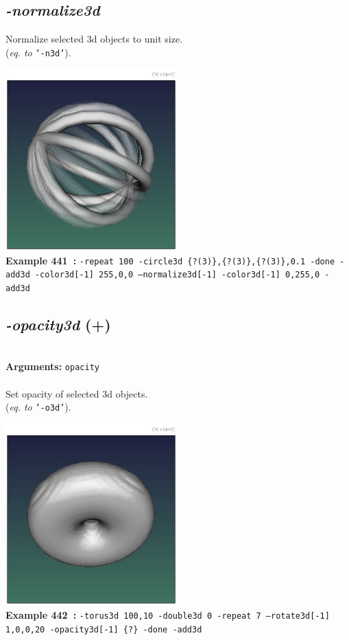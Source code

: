 \documentclass[a4paper,11pt,twoside]{book}
\begin{document}
\subsection{\emph{-normalize3d} }\vspace*{-0.5em}
Normalize selected 3d objects to unit size.
~\\(\emph{eq. to} {\small \texttt{'-n3d'}}).
\begin{center}\includegraphics[keepaspectratio=true,height=7cm,width=\textwidth]{img/gmic_def441.jpg}\\
{\footnotesize \textbf{Example 441~:} \texttt{-repeat 100 -circle3d \{?(3)\},\{?(3)\},\{?(3)\},0.1 -done -add3d -color3d[-1] 255,0,0 --normalize3d[-1] -color3d[-1] 0,255,0 -add3d}}
\end{center}

\subsection{\emph{-opacity3d} (+)}\vspace*{-0.5em}
~\\\textbf{Arguments: } 
{\small \texttt{opacity}}\\~\\
Set opacity of selected 3d objects.
~\\(\emph{eq. to} {\small \texttt{'-o3d'}}).
\begin{center}\includegraphics[keepaspectratio=true,height=7cm,width=\textwidth]{img/gmic_def442.jpg}\\
{\footnotesize \textbf{Example 442~:} \texttt{-torus3d 100,10 -double3d 0 -repeat 7 --rotate3d[-1] 1,0,0,20 -opacity3d[-1] \{?\} -done -add3d}}
\end{center}
\end{document}
